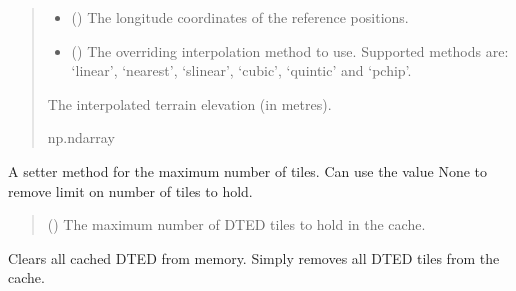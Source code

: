 \documentclass[letterpaper,10pt,english]{sphinxmanual}
\begin{document}
\begin{fulllineitems}
\begin{fulllineitems}
\begin{quote}
\begin{description}
\begin{itemize}
\item {} 
\sphinxAtStartPar
{} () \textendash{} The longitude coordinates of the reference positions.

\item {} 
\sphinxAtStartPar
{} () \textendash{} The overriding interpolation method to use. Supported
methods are: ‘linear’, ‘nearest’, ‘slinear’, ‘cubic’,
‘quintic’ and ‘pchip’.

\end{itemize}

\sphinxAtStartPar
The interpolated terrain elevation (in metres).

\sphinxAtStartPar
np.ndarray

\end{description}\end{quote}

\end{fulllineitems}


\begin{fulllineitems}
\label{\detokenize{modules/earth/dted:qnav.earth.dted.DtedHandler.set_max_tiles}}
\pysigstartsignatures
{}
\pysigstopsignatures
\sphinxAtStartPar
A setter method for the maximum number of tiles.
Can use the value None to remove limit on number of tiles to hold.
\begin{quote}\begin{description}
\sphinxAtStartPar
{} () \textendash{} The maximum number of DTED tiles to hold in the cache.

\end{description}\end{quote}

\end{fulllineitems}


\begin{fulllineitems}
\label{\detokenize{modules/earth/dted:qnav.earth.dted.DtedHandler.clear_cache}}
\pysigstartsignatures
{}
\pysigstopsignatures
\sphinxAtStartPar
Clears all cached DTED from memory.
Simply removes all DTED tiles from the cache.

\end{fulllineitems}


\end{fulllineitems}
\end{document}
